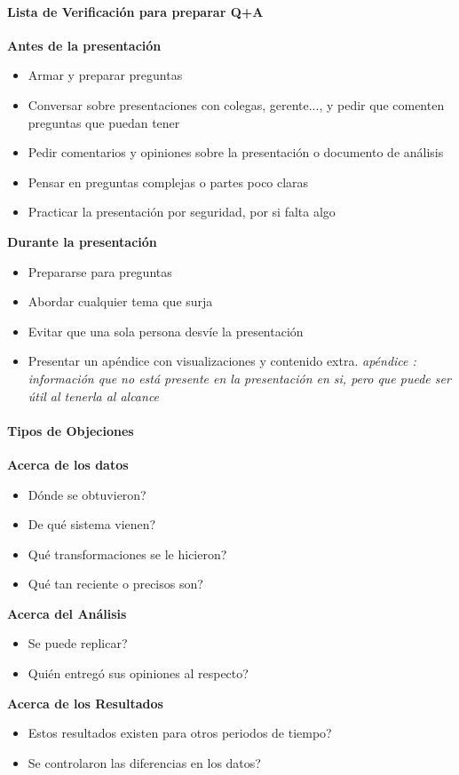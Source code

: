 \paragraph{Lista de Verificación para preparar Q+A}
\textbf{Antes de la presentación}
\begin{itemize}
    \item {Armar y preparar preguntas}
    \item {Conversar sobre presentaciones con colegas, gerente..., y pedir que comenten preguntas que puedan tener}
    \item {Pedir comentarios y opiniones sobre la presentación o documento de análisis}
    \item {Pensar en preguntas complejas o partes poco claras}
    \item {Practicar la presentación por seguridad, por si falta algo}
\end{itemize}
\textbf{Durante la presentación}
\begin{itemize}
    \item {Prepararse para preguntas}
    \item {Abordar cualquier tema que surja}
    \item {Evitar que una sola persona desvíe la presentación}
    \item {Presentar un apéndice con visualizaciones y contenido extra. \textit{apéndice : información que no está presente en la presentación en si, pero que puede ser útil al tenerla al alcance}}
\end{itemize}

\paragraph{Tipos de Objeciones}
\textbf{Acerca de los datos}
\begin{itemize}
    \item {Dónde se obtuvieron?}
    \item {De qué sistema vienen?}
    \item {Qué transformaciones se le hicieron?}
    \item {Qué tan reciente o precisos son?}
\end{itemize}
\textbf{Acerca del Análisis}
\begin{itemize}
    \item {Se puede replicar?}
    \item {Quién entregó sus opiniones al respecto?}
\end{itemize}
\textbf{Acerca de los Resultados}
\begin{itemize}
    \item {Estos resultados existen para otros periodos de tiempo?}
    \item {Se controlaron las diferencias en los datos?}
\end{itemize}

